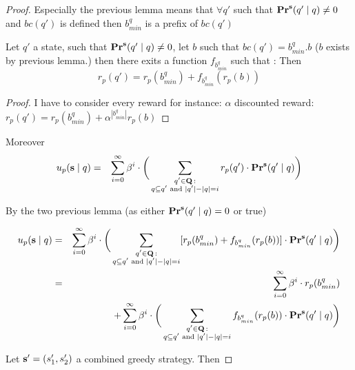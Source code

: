 \begin{proof}
Especially the previous lemma means that $\forall q'$ such that $\mathbf{Pr}^{\mathbf{s}}(q' \mid q) \neq 0$ and $bc(q')$ is defined then $b^q_{min}$ is a prefix of $bc(q')$



\begin{mylem}
	Let $q'$ a state, such that $\mathbf{Pr}^{\mathbf{s}}(q' \mid q) \neq 0$, let $b$ such that $bc(q') = b^q_{min}.b$ ($b$ exists by previous lemma.) then there exits a function $f_{b^q_{min}}$ such that :
	Then  $$r_p(q') = r_p(b^q_{min}) + f_{b^q_{min}}(r_p(b))$$
\end{mylem}
\begin{proof}
	I have to consider every reward for instance:  $\alpha$ discounted reward: 
	$r_p(q') = r_p(b^q_{min}) + \alpha^{|b^q_{min}|}r_p(b)$
\end{proof}

Moreover
\begin{eqnarray*}
	u_p(\mathbf{s} \mid q) & = & \sum_{i=0}^{\infty}\beta^{i} \cdot  \bigg(\sum_{\substack{q' \in \mathbf{Q} \,: \\ q \subseteq q' \text{ {\rm and} } |q'| - |q| = i}} r_p(q') \cdot 
	\mathbf{Pr}^{\mathbf{s}}(q' \mid q)\bigg)
\end{eqnarray*}

By the two previous lemma (as either $\mathbf{Pr}^{\mathbf{s}}(q' \mid q) = 0$ or true) 

\begin{eqnarray*}
	u_p(\mathbf{s} \mid q) & = & \sum_{i=0}^{\infty}\beta^{i} \cdot  \bigg(\sum_{\substack{q' \in \mathbf{Q} \,: \\ q \subseteq q' \text{ {\rm and} } |q'| - |q| = i}} [r_p(b^q_{min}) + f_{b^q_{min}}(r_p(b))] \cdot 
	\mathbf{Pr}^{\mathbf{s}}(q' \mid q)\bigg) \\ 
	& = & \sum_{i=0}^{\infty}\beta^{i} \cdot  r_p(b^q_{min})  \\ 
	&&+ \sum_{i=0}^{\infty}\beta^{i} \cdot  \bigg(\sum_{\substack{q' \in \mathbf{Q} \,: \\ q \subseteq q' \text{ {\rm and} } |q'| - |q| = i}}  f_{b^q_{min}}(r_p(b)) \cdot 
	\mathbf{Pr}^{\mathbf{s}}(q' \mid q)\bigg) \\ 
\end{eqnarray*}

Let $\mathbf{s}' = (s_1',s_2')$ a combined greedy strategy. 
Then 


\end{proof}
